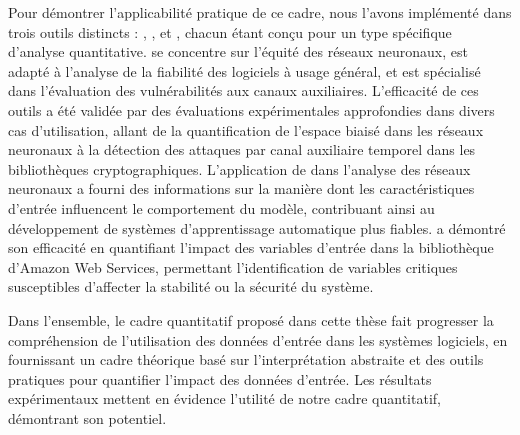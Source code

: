 {Pour démontrer l'applicabilité pratique de ce cadre, nous l'avons implémenté dans trois outils distincts : \libra, \impatto, et \timesec, chacun étant conçu pour un type spécifique d'analyse quantitative. \libra{} se concentre sur l'équité des réseaux neuronaux, \impatto{} est adapté à l'analyse de la fiabilité des logiciels à usage général, et \timesec{} est spécialisé dans l'évaluation des vulnérabilités aux canaux auxiliaires. L'efficacité de ces outils a été validée par des évaluations expérimentales approfondies dans divers cas d'utilisation, allant de la quantification de l'espace biaisé dans les réseaux neuronaux à la détection des attaques par canal auxiliaire temporel dans les bibliothèques cryptographiques. L'application de \libra{} dans l'analyse des réseaux neuronaux a fourni des informations sur la manière dont les caractéristiques d'entrée influencent le comportement du modèle, contribuant ainsi au développement de systèmes d'apprentissage automatique plus fiables. \timesec{} a démontré son efficacité en quantifiant l'impact des variables d'entrée dans la bibliothèque \bignum{} d'Amazon Web Services, permettant l'identification de variables critiques susceptibles d'affecter la stabilité ou la sécurité du système.

Dans l'ensemble, le cadre quantitatif proposé dans cette thèse fait progresser la compréhension de l'utilisation des données d'entrée dans les systèmes logiciels, en fournissant un cadre théorique basé sur l'interprétation abstraite et des outils pratiques pour quantifier l'impact des données d'entrée. Les résultats expérimentaux mettent en évidence l'utilité de notre cadre quantitatif, démontrant son potentiel.
}

